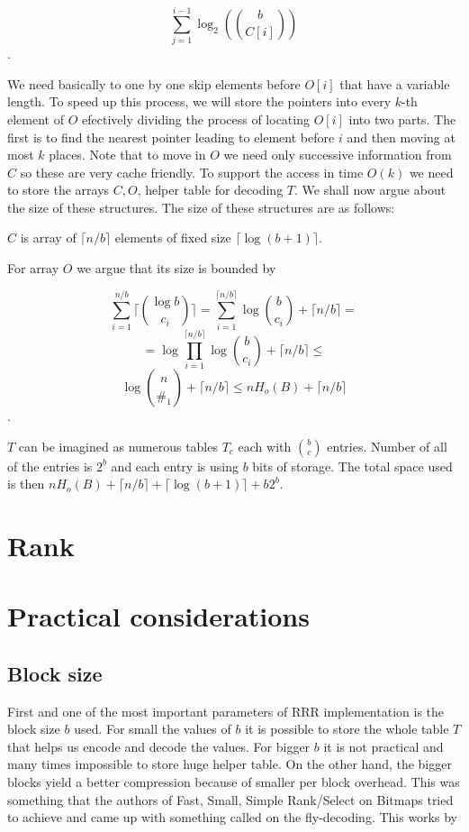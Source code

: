                     $$\sum_{j=1}^{i-1} \log_2({b\choose C[i]})$$.

We need basically to one by one skip elements before $O[i]$ that have a variable
length. To speed up this process, we will store the pointers into every $k$-th
element of $O$ efectively dividing the process of locating $O[i]$ into two parts.
The first is to find the nearest pointer leading to element before $i$ and then
moving at most $k$ places. Note that to move in $O$ we need only successive
information from $C$ so these are very cache friendly. To support the access in
time $O(k)$ we need to store the arrays $C, O$, helper table for decoding $T$.
We shall now argue about the size of these structures. The size of these structures
are as follows:

$C$ is array of $\lceil n/b \rceil$ elements of fixed size $\lceil \log(b+1) \rceil$.

For array $O$ we argue that its size is bounded by

$$\sum_{i=1}^{n/b} \bigg\lceil{\log b\choose c_i}\bigg\rceil =
\sum_{i=1}^{\lceil n/b \rceil} \log {b\choose c_i} + \lceil n/b \rceil =$$
$$=\log\prod_{i=1}^{\lceil n/b \rceil} \log {b\choose c_i} + \lceil n/b \rceil \leq $$
$$\log{n\choose \#_1} +  \lceil n/b \rceil \leq nH_o(B) +  \lceil n/b \rceil$$.

$T$ can be imagined as numerous tables $T_c$ each with ${b\choose c}$ entries.
Number of  all of the entries is $2^b$ and each entry is using $b$ bits of storage.
The total space used is then $nH_o(B) +  \lceil n/b \rceil + \lceil \log(b+1) \rceil + b2^b$.

\section{Rank}

\section{Practical considerations}

\subsection{Block size}

First and one of the most important parameters of RRR implementation is the block
size $b$ used. For small the values of $b$ it is possible to store the whole table
$T$ that helps us encode and decode the values. For bigger $b$ it is not practical
and many times impossible to store huge helper table. On the other hand, the bigger
blocks yield a better compression because of smaller per block overhead. This was
something that the authors of Fast, Small, Simple Rank/Select on Bitmaps tried to
achieve and came up with something called on the fly-decoding. This works by
